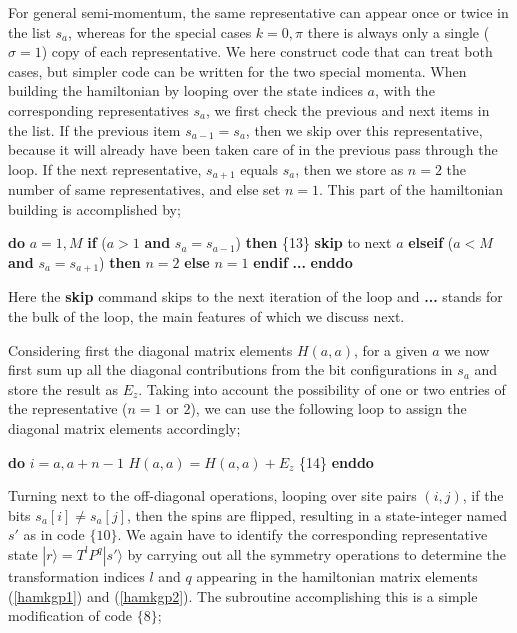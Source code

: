 \documentclass[draft,numberedheadings]{aipproc}
\newcommand{\code}{\null\vskip-2mm\noindent}
\newcommand{\br}{\hfill\break}
\newcommand{\cia}{\null\hskip5mm}
\newcommand{\cib}{\null\hskip10mm}
\newcommand{\cic}{\null\hskip15mm}
\begin{document}
For general semi-momentum, the same representative can appear once or twice in the list $s_a$, whereas for the special cases $k=0,\pi$ there is always only a 
single ($\sigma=1$) copy of each representative. We here construct code that can treat both cases, but simpler code can be written for the two special momenta.
When building the hamiltonian by looping over the state indices $a$, with the corresponding representatives $s_a$, we first check the previous and next items 
in the list. If the previous item $s_{a-1}=s_a$, then we skip over this representative, because it will already have been taken care of in the previous pass 
through the loop. If the next representative, $s_{a+1}$ equals $s_a$, then we store as $n=2$ the number of same representatives, and else set $n=1$. This part of 
the hamiltonian building is accomplished by;

{\code
\cia       {\bf do} $a=1,M$ \br 
\cib           {\bf if} ($a>1$ {\bf and} $s_a=s_{a-1}$) {\bf then}          \hfill \{13\}\break
\cic               {\bf skip } {\rm to next} $a$ \br
\cib           {\bf elseif} ($a<M$ {\bf and} $s_a=s_{a+1}$) {\bf then} \br
\cic               $n=2$ \br
\cib           {\bf else} \br
\cic               $n=1$ \br
\cib           {\bf endif} \br
\cib           {\bf ...}   \br
\cia       {\bf enddo} 
\code}

\noindent
Here the {\bf skip} command skips to the next iteration of the loop and {\bf ...} stands for the bulk of the loop, the main features of which 
we discuss next. 

Considering first the diagonal matrix elements $H(a,a)$, for a given $a$ we now first sum up all the diagonal contributions from the bit configurations
in $s_a$ and store the result as $E_z$. Taking into account the possibility of one or two entries of the representative ($n=1$ or $2$), we can use the following 
loop to assign the diagonal matrix elements accordingly;

{\code
\cia       {\bf do} $i=a,a+n-1$ \br 
\cib           $H(a,a)=H(a,a)+E_z$          \hfill \{14\}\break
\cia       {\bf enddo} 
\code}

\noindent
Turning next to the off-diagonal operations, looping over site pairs $(i,j)$, if the bits $s_a[i]\not=s_a[j]$, then the spins are flipped, resulting in 
a state-integer named $s'$ as in code $\{10\}$. We again have to identify the corresponding representative state $|r\rangle=T^lP^q|s'\rangle$ by carrying out 
all the symmetry operations to determine the transformation indices $l$ and $q$ appearing in the hamiltonian matrix elements (\ref{hamkgp1}) and 
(\ref{hamkgp2}). The subroutine accomplishing this is a simple modification of code $\{8\}$;
\end{document}

